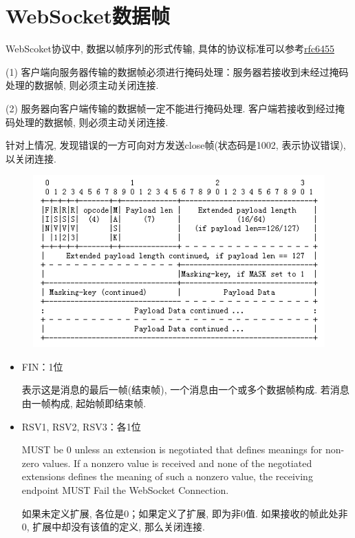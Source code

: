 \section {\ZHH WebSocket数据帧} {

    {WebScoket协议中, 数据以帧序列的形式传输, 具体的协议标准可以参考\href{http://tools.ietf.org/html/rfc6455}{rfc6455}}\par

    {(1) 客户端向服务器传输的数据帧必须进行掩码处理：服务器若接收到未经过掩码处理的数据帧, 则必须主动关闭连接.}\par
    {(2) 服务器向客户端传输的数据帧一定不能进行掩码处理. 客户端若接收到经过掩码处理的数据帧, 则必须主动关闭连接.}\par

    {针对上情况, 发现错误的一方可向对方发送close帧(状态码是1002, 表示协议错误), 以关闭连接.}\par

    \begin {figure} [htbp]
        \centering
        \includegraphics {frame.png}
    \end {figure}

    \begin {itemize}
    \item {FIN：1位}\par
          {表示这是消息的最后一帧(结束帧), 一个消息由一个或多个数据帧构成. 若消息由一帧构成, 起始帧即结束帧.}\par

    \item {RSV1, RSV2, RSV3：各1位}\par
          {MUST be 0 unless an extension is negotiated that defines meanings for non-zero values. If a nonzero value is received and none of the negotiated extensions defines the meaning of such a nonzero value,  the receiving endpoint MUST Fail the WebSocket Connection.}\par
          {如果未定义扩展, 各位是0；如果定义了扩展, 即为非0值. 如果接收的帧此处非0, 扩展中却没有该值的定义, 那么关闭连接.}\par


\end{itemize}}
